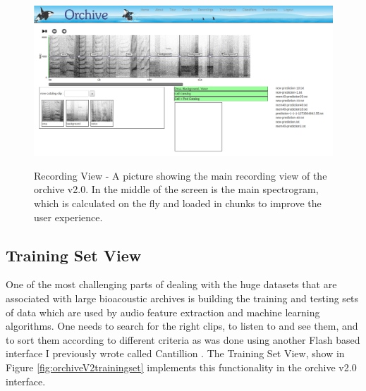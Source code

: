 \begin{figure}[t]
\centering
\includegraphics[width=\columnwidth]{figures/orchiveV2recording}
\label{fig:orchiveV2recording}
\caption{Recording View - A picture showing the main recording view of
the orchive v2.0.  In the middle of the screen is the main spectrogram,
which is calculated on the fly and loaded in chunks to improve the
user experience.}
\end{figure}


\subsection{Training Set View}

One of the most challenging parts of dealing with the huge datasets
that are associated with large bioacoustic archives is building the
training and testing sets of data which are used by audio feature
extraction and machine learning algorithms.  One needs to search for
the right clips, to listen to and see them, and to sort them according
to different criteria as was done using
another Flash based interface I previously wrote called Cantillion
\cite{biro2012computational}.  The Training Set View, show in Figure
\ref{fig:orchiveV2trainingset} implements this functionality in the
orchive v2.0 interface.

